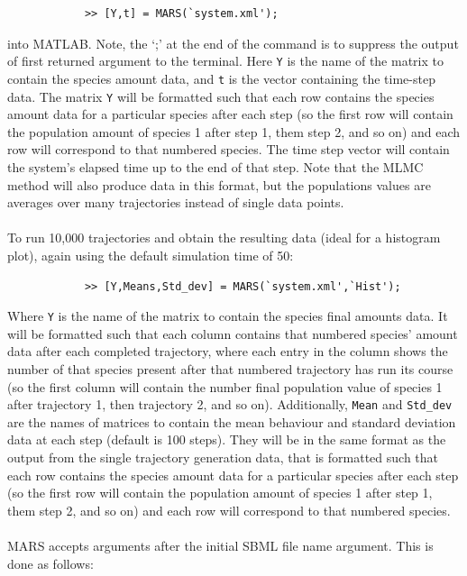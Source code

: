 \documentclass[ugrad,lot,lof,openright,11pt,oneside,onehalfspace]{RUthesis}
\begin{document}
		\begin{verbatim}
		    >> [Y,t] = MARS(`system.xml');
		\end{verbatim}

		\noindent
		into MATLAB. Note, the `;' at the end of the command is to suppress the output of first returned argument to the terminal. Here \verb|Y| is the name of the matrix to contain the species amount data, and \verb|t| is the vector containing the time-step data. The matrix \verb|Y| will be formatted such that each row contains the species amount data for a particular species after each step (so the first row will contain the population amount of species 1 after step 1, them step 2, and so on) and each row will correspond to that numbered species. The time step vector will contain the system's elapsed time up to the end of that step. Note that the MLMC method will also produce data in this format, but the populations values are averages over many trajectories instead of single data points.\\
		\\
		To run 10,000 trajectories and obtain the resulting data (ideal for a histogram plot), again using the default simulation time of 50:

		\begin{verbatim}
		    >> [Y,Means,Std_dev] = MARS(`system.xml',`Hist');
		\end{verbatim}

		\noindent
		Where \verb|Y| is the name of the matrix to contain the species final amounts data. It will be formatted such that each column contains that numbered species' amount data after each completed trajectory, where each entry in the column shows the number of that species present after that numbered trajectory has run its course (so the first column will contain the number final population value of species 1 after trajectory 1, then trajectory 2, and so on). Additionally, \verb|Mean| and \verb|Std_dev| are the names of matrices to contain the mean behaviour and standard deviation data at each step (default is 100 steps). They will be in the same format as the output from the single trajectory generation data, that is formatted such that each row contains the species amount data for a particular species after each step (so the first row will contain the population amount of species 1 after step 1, them step 2, and so on) and each row will correspond to that numbered species.\\
		\\
		MARS accepts arguments after the initial SBML file name argument. This is done as follows:
\end{document}
